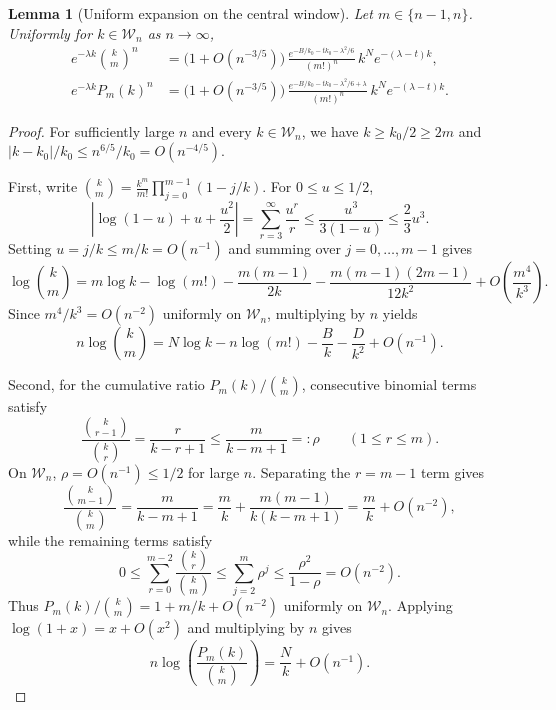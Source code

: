 \documentclass[11pt,a4paper]{article}
\newtheorem{lemma}[theorem]{Lemma}
\theoremstyle{remark}
\begin{document}
\begin{lemma}[Uniform expansion on the central window]\label{lem:central}
Let $m\in\{n-1,n\}$. Uniformly for $k\in\mathcal{W}_n$ as $n\to\infty$,
\begin{align}
  e^{-\lambda k}\binom{k}{m}^n
  &= \bigl(1 + O(n^{-3/5})\bigr)\,
     \frac{e^{-B/k_0 - t k_0 - \lambda^2/6}}{(m!)^n}\, k^N e^{-(\lambda - t)k},
     \label{eq:central-bin}\\
  e^{-\lambda k} P_m(k)^n
  &= \bigl(1 + O(n^{-3/5})\bigr)\,
     \frac{e^{-B/k_0 - t k_0 - \lambda^2/6 + \lambda}}{(m!)^n}\, k^N e^{-(\lambda - t)k}.
     \label{eq:central-cum}
\end{align}
\end{lemma}

\begin{proof}
For sufficiently large $n$ and every $k\in\mathcal{W}_n$, we have $k \ge k_0/2 \ge 2m$ and $|k - k_0|/k_0 \le n^{6/5}/k_0 = O(n^{-4/5})$.

First, write $\binom{k}{m} = \frac{k^m}{m!}\prod_{j=0}^{m-1}(1 - j/k)$. For $0\le u\le 1/2$,
\[
  \left|\log(1-u) + u + \frac{u^2}{2}\right|
  = \sum_{r=3}^{\infty}\frac{u^r}{r}
  \le \frac{u^3}{3(1-u)}
  \le \frac{2}{3}u^3.
\]
Setting $u = j/k \le m/k = O(n^{-1})$ and summing over $j=0,\dots,m-1$ gives
\[
  \log\binom{k}{m}
  = m\log k - \log(m!) - \frac{m(m-1)}{2k} - \frac{m(m-1)(2m-1)}{12k^2} + O\!\left(\frac{m^4}{k^3}\right).
\]
Since $m^4/k^3 = O(n^{-2})$ uniformly on $\mathcal{W}_n$, multiplying by $n$ yields
\begin{equation}\label{eq:log-binom-central}
  n\log\binom{k}{m} = N\log k - n\log(m!) - \frac{B}{k} - \frac{D}{k^2} + O(n^{-1}).
\end{equation}

Second, for the cumulative ratio $P_m(k)/\binom{k}{m}$, consecutive binomial terms satisfy
\begin{equation}\label{eq:binom-step-ratio}
  \frac{\binom{k}{r-1}}{\binom{k}{r}} = \frac{r}{k-r+1} \le \frac{m}{k-m+1} =: \rho
  \qquad (1\le r\le m).
\end{equation}
On $\mathcal{W}_n$, $\rho = O(n^{-1}) \le 1/2$ for large $n$. Separating the $r=m-1$ term gives
\[
  \frac{\binom{k}{m-1}}{\binom{k}{m}} = \frac{m}{k-m+1} = \frac{m}{k} + \frac{m(m-1)}{k(k-m+1)} = \frac{m}{k} + O(n^{-2}),
\]
while the remaining terms satisfy
\[
  0 \le \sum_{r=0}^{m-2}\frac{\binom{k}{r}}{\binom{k}{m}}
  \le \sum_{j=2}^{m}\rho^j
  \le \frac{\rho^2}{1-\rho}
  = O(n^{-2}).
\]
Thus $P_m(k)/\binom{k}{m} = 1 + m/k + O(n^{-2})$ uniformly on $\mathcal{W}_n$. Applying $\log(1+x) = x + O(x^2)$ and multiplying by $n$ gives
\begin{equation}\label{eq:log-P-ratio-central}
  n\log\!\left(\frac{P_m(k)}{\binom{k}{m}}\right) = \frac{N}{k} + O(n^{-1}).
\end{equation}


\end{proof}
\end{document}
